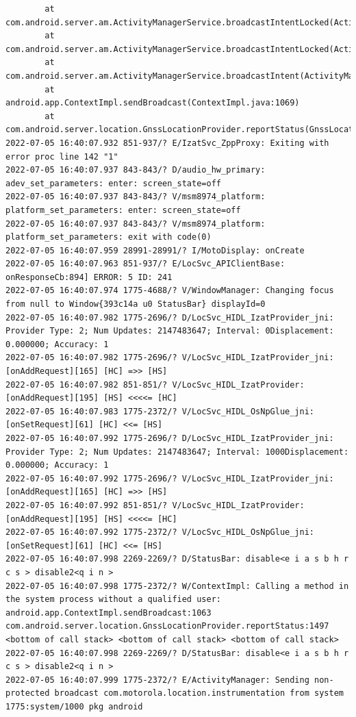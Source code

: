\documentclass[a4paper,12pt]{book}
\begin{document}
\begin{lstlisting}
        at com.android.server.am.ActivityManagerService.broadcastIntentLocked(ActivityManagerService.java:16073)
        at com.android.server.am.ActivityManagerService.broadcastIntentLocked(ActivityManagerService.java:15442)
        at com.android.server.am.ActivityManagerService.broadcastIntent(ActivityManagerService.java:16227)
        at android.app.ContextImpl.sendBroadcast(ContextImpl.java:1069)
        at com.android.server.location.GnssLocationProvider.reportStatus(GnssLocationProvider.java:1497)
2022-07-05 16:40:07.932 851-937/? E/IzatSvc_ZppProxy: Exiting with error proc line 142 "1"
2022-07-05 16:40:07.937 843-843/? D/audio_hw_primary: adev_set_parameters: enter: screen_state=off
2022-07-05 16:40:07.937 843-843/? V/msm8974_platform: platform_set_parameters: enter: screen_state=off
2022-07-05 16:40:07.937 843-843/? V/msm8974_platform: platform_set_parameters: exit with code(0)
2022-07-05 16:40:07.959 28991-28991/? I/MotoDisplay: onCreate
2022-07-05 16:40:07.963 851-937/? E/LocSvc_APIClientBase: onResponseCb:894] ERROR: 5 ID: 241
2022-07-05 16:40:07.974 1775-4688/? V/WindowManager: Changing focus from null to Window{393c14a u0 StatusBar} displayId=0
2022-07-05 16:40:07.982 1775-2696/? D/LocSvc_HIDL_IzatProvider_jni: Provider Type: 2; Num Updates: 2147483647; Interval: 0Displacement: 0.000000; Accuracy: 1
2022-07-05 16:40:07.982 1775-2696/? V/LocSvc_HIDL_IzatProvider_jni: [onAddRequest][165] [HC] =>> [HS]
2022-07-05 16:40:07.982 851-851/? V/LocSvc_HIDL_IzatProvider: [onAddRequest][195] [HS] <<<<= [HC]
2022-07-05 16:40:07.983 1775-2372/? V/LocSvc_HIDL_OsNpGlue_jni: [onSetRequest][61] [HC] <<= [HS]
2022-07-05 16:40:07.992 1775-2696/? D/LocSvc_HIDL_IzatProvider_jni: Provider Type: 2; Num Updates: 2147483647; Interval: 1000Displacement: 0.000000; Accuracy: 1
2022-07-05 16:40:07.992 1775-2696/? V/LocSvc_HIDL_IzatProvider_jni: [onAddRequest][165] [HC] =>> [HS]
2022-07-05 16:40:07.992 851-851/? V/LocSvc_HIDL_IzatProvider: [onAddRequest][195] [HS] <<<<= [HC]
2022-07-05 16:40:07.992 1775-2372/? V/LocSvc_HIDL_OsNpGlue_jni: [onSetRequest][61] [HC] <<= [HS]
2022-07-05 16:40:07.998 2269-2269/? D/StatusBar: disable<e i a s b h r c s > disable2<q i n >
2022-07-05 16:40:07.998 1775-2372/? W/ContextImpl: Calling a method in the system process without a qualified user: android.app.ContextImpl.sendBroadcast:1063 com.android.server.location.GnssLocationProvider.reportStatus:1497 <bottom of call stack> <bottom of call stack> <bottom of call stack> 
2022-07-05 16:40:07.998 2269-2269/? D/StatusBar: disable<e i a s b h r c s > disable2<q i n >
2022-07-05 16:40:07.999 1775-2372/? E/ActivityManager: Sending non-protected broadcast com.motorola.location.instrumentation from system 1775:system/1000 pkg android

\end{lstlisting}
\end{document}
